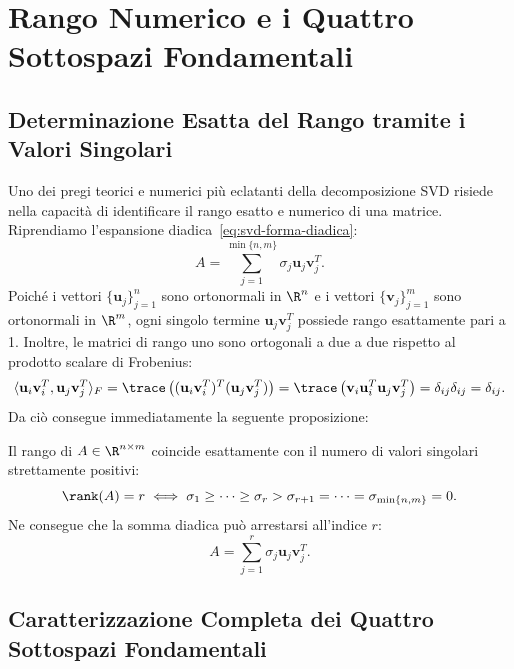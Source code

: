 \FloatBarrier
\section{Rango Numerico e i Quattro Sottospazi Fondamentali}
\label{sec:svd-quattro-sottospazi}

\subsection{Determinazione Esatta del Rango tramite i Valori Singolari}

Uno dei pregi teorici e numerici pi\`u eclatanti della decomposizione SVD risiede nella capacit\`a di identificare il rango esatto e numerico di una matrice.
Riprendiamo l'espansione diadica~\eqref{eq:svd-forma-diadica}:
\begin{equation}
    A = \sum_{j=1}^{\min\{n, m\}} \sigma_j \mathbf{u}_j \mathbf{v}_j^T.
\end{equation}
Poich\'e i vettori $\{\mathbf{u}_j\}_{j=1}^n$ sono ortonormali in $\R^n$ e i vettori $\{\mathbf{v}_j\}_{j=1}^m$ sono ortonormali in $\R^m$, ogni singolo termine $\mathbf{u}_j \mathbf{v}_j^T$ possiede rango esattamente pari a 1. Inoltre, le matrici di rango uno sono ortogonali a due a due rispetto al prodotto scalare di Frobenius:
\begin{equation}
    \langle \mathbf{u}_i \mathbf{v}_i^T, \mathbf{u}_j \mathbf{v}_j^T \rangle_F = \trace\left( (\mathbf{u}_i \mathbf{v}_i^T)^T (\mathbf{u}_j \mathbf{v}_j^T) \right) = \trace\left( \mathbf{v}_i \mathbf{u}_i^T \mathbf{u}_j \mathbf{v}_j^T \right) = \delta_{ij} \delta_{ij} = \delta_{ij}.
\end{equation}
Da ci\`o consegue immediatamente la seguente proposizione:

\begin{proposition}
Il rango di $A \in \R^{n \times m}$ coincide esattamente con il numero di valori singolari strettamente positivi:
\begin{equation}
    \rank(A) = r \iff \sigma_1 \ge \dots \ge \sigma_r > \sigma_{r+1} = \dots = \sigma_{\min\{n, m\}} = 0.
\end{equation}
Ne consegue che la somma diadica pu\`o arrestarsi all'indice $r$:
\begin{equation}
    A = \sum_{j=1}^r \sigma_j \mathbf{u}_j \mathbf{v}_j^T.
\end{equation}
\end{proposition}

\subsection{Caratterizzazione Completa dei Quattro Sottospazi Fondamentali}

